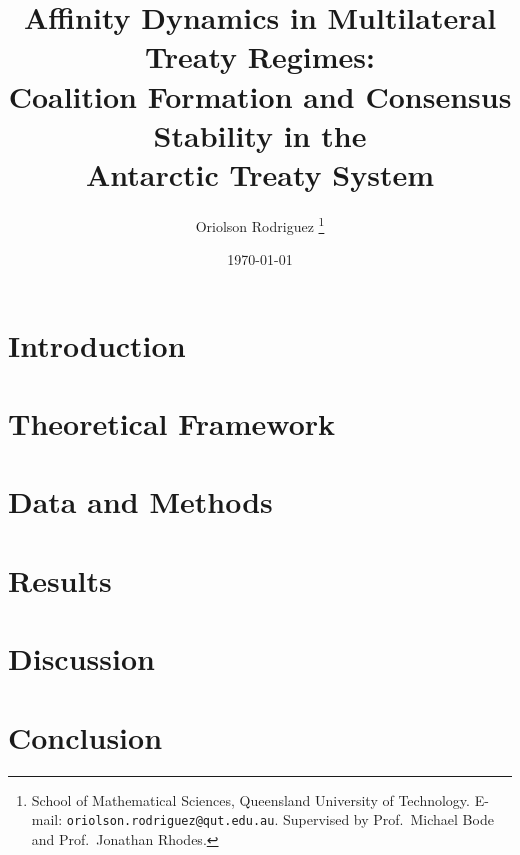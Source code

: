 \documentclass[12pt,a4paper]{article}
\title{Affinity Dynamics in Multilateral Treaty Regimes:\\
       Coalition Formation and Consensus Stability in the\\
       Antarctic Treaty System}
\author{Oriolson Rodriguez%
  \thanks{School of Mathematical Sciences, Queensland University of Technology.
          E-mail: \texttt{oriolson.rodriguez@qut.edu.au}.
          Supervised by Prof.\ Michael Bode and Prof.\ Jonathan Rhodes.}}
\date{\today}
\theoremstyle{plain}
\theoremstyle{definition}
\begin{document}
\maketitle

\begin{abstract}
\end{abstract}

\section{Introduction}
\label{sec:intro}


\section{Theoretical Framework}
\label{sec:theory}


\section{Data and Methods}
\label{sec:methods}


\section{Results}
\label{sec:results}


\section{Discussion}
\label{sec:discussion}


\section{Conclusion}
\label{sec:conclusion}


\printbibliography
\end{document}
